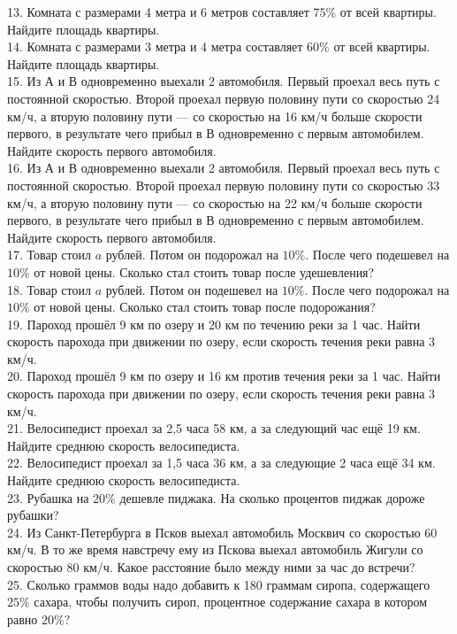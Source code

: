 \documentclass[12pt]{article}
\begin{document}
13. Комната с размерами 4 метра и 6 метров составляет $75\%$ от всей квартиры. Найдите площадь квартиры.\\
14. Комната с размерами 3 метра и 4 метра составляет $60\%$ от всей квартиры. Найдите площадь квартиры.\\
15. Из А и В одновременно выехали 2 автомобиля. Первый проехал весь путь с постоянной скоростью. Второй проехал первую половину пути со скоростью 24 км/ч, а вторую половину пути --- со скоростью на 16 км/ч больше скорости первого, в результате чего прибыл в В одновременно с первым автомобилем. Найдите скорость первого автомобиля.\\
16. Из А и В одновременно выехали 2 автомобиля. Первый проехал весь путь с постоянной скоростью. Второй проехал первую половину пути со скоростью 33 км/ч, а вторую половину пути --- со скоростью на 22 км/ч больше скорости первого, в результате чего прибыл в В одновременно с первым автомобилем. Найдите скорость первого автомобиля.\\
17. Товар стоил $a$ рублей. Потом он подорожал на $10\%.$ После чего подешевел на $10\%$ от новой цены. Сколько стал стоить товар после удешевления?\\
18. Товар стоил $a$ рублей. Потом он подешевел на $10\%.$ После чего подорожал на $10\%$ от новой цены. Сколько стал стоить товар после подорожания?\\
19. Пароход прошёл 9 км по озеру и 20 км по течению реки за 1 час. Найти скорость парохода при движении по озеру, если скорость течения реки равна 3 км/ч.\\
20. Пароход прошёл 9 км по озеру и 16 км против течения реки за 1 час. Найти скорость парохода при движении по озеру, если скорость течения реки равна 3 км/ч.\\
21. Велосипедист проехал за 2,5 часа 58 км, а за следующий час ещё 19 км. Найдите среднюю скорость велосипедиста.\\
22. Велосипедист проехал за 1,5 часа 36 км, а за следующие 2 часа ещё 34 км. Найдите среднюю скорость велосипедиста.\\
23. Рубашка на $20\%$ дешевле пиджака. На сколько процентов пиджак дороже рубашки?\\
24. Из Санкт-Петербурга в Псков выехал автомобиль Москвич со скоростью 60 км/ч. В то же время навстречу ему из Пскова выехал автомобиль Жигули со скоростью 80 км/ч. Какое расстояние было между ними за час до встречи?\\
25. Сколько граммов воды надо добавить к 180 граммам сиропа, содержащего $25\%$ сахара, чтобы получить сироп, процентное содержание сахара в котором равно $20\%?$\\
\end{document}
